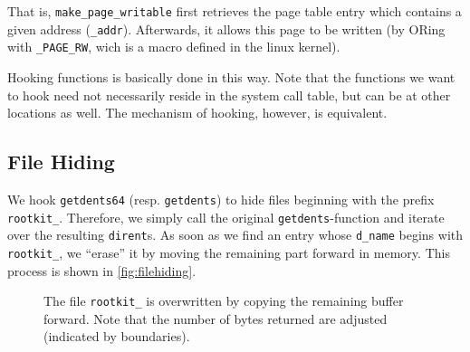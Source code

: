 \documentclass[10pt, letterpaper]{article}
\newcommand{\todo}[1]{}%
\begin{document}
That is, \texttt{make\_page\_writable} first retrieves the page table entry which contains a given address (\texttt{\_addr}). Afterwards, it allows this page to be written (by ORing with \texttt{\_PAGE\_RW}, wich is a macro defined in the linux kernel). \todo{Is this correct, what I'm writing here?}

Hooking functions is basically done in this way. Note that the functions we want to hook need not necessarily reside in the system call table, but can be at other locations as well. The mechanism of hooking, however, is equivalent.

\subsection{File Hiding}
\label{filehiding}
We hook \texttt{getdents64} (resp. \texttt{getdents}) to hide files beginning with the prefix \texttt{rootkit\_}. 
Therefore, we simply call the original \texttt{getdents}-function and iterate over the resulting
\texttt{dirent}s. As soon as we find an entry whose \texttt{d\_name} begins with \texttt{rootkit\_},
we ``erase'' it by moving the remaining part forward in memory. This process is shown in \autoref{fig:filehiding}.


\begin{figure}[ht]
\centering
{}
\caption{The file \texttt{rootkit\_} is overwritten by copying the remaining buffer forward. Note that the number of bytes returned are adjusted (indicated by boundaries).}
\label{fig:filehiding}
\end{figure}
\end{document}
